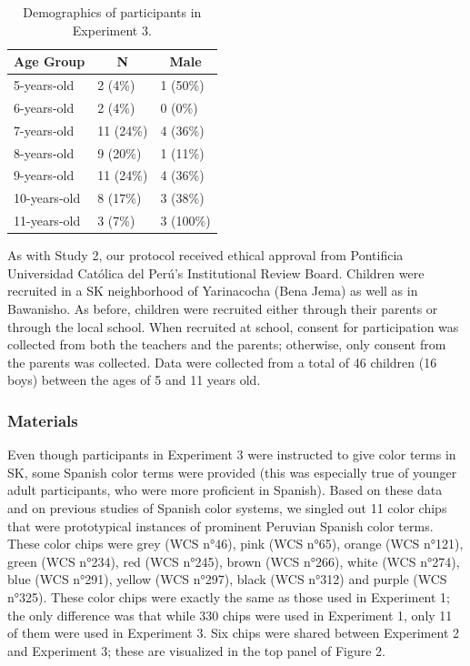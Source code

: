 \documentclass[floatsintext,man]{apa6}
\theoremstyle{definition}
\theoremstyle{definition}
\theoremstyle{definition}
\theoremstyle{remark}
\begin{document}
\begin{table}[tbp]
\begin{center}
\begin{threeparttable}
\caption{\label{tab:unnamed-chunk-3}Demographics of participants in Experiment 3.}
\begin{tabular}{lll}
\toprule
Age Group & \multicolumn{1}{c}{N} & \multicolumn{1}{c}{Male}\\
\midrule
5-years-old & 2 (4\%) & 1 (50\%)\\
6-years-old & 2 (4\%) & 0 (0\%)\\
7-years-old & 11 (24\%) & 4 (36\%)\\
8-years-old & 9 (20\%) & 1 (11\%)\\
9-years-old & 11 (24\%) & 4 (36\%)\\
10-years-old & 8 (17\%) & 3 (38\%)\\
11-years-old & 3 (7\%) & 3 (100\%)\\
\bottomrule
\end{tabular}
\end{threeparttable}
\end{center}
\end{table}

As with Study 2, our protocol received ethical approval from Pontificia
Universidad Católica del Perú's Institutional Review Board. Children
were recruited in a SK neighborhood of Yarinacocha (Bena Jema) as well
as in Bawanisho. As before, children were recruited either through their
parents or through the local school. When recruited at school, consent
for participation was collected from both the teachers and the parents;
otherwise, only consent from the parents was collected. Data were
collected from a total of 46 children (16 boys) between the ages of 5
and 11 years old.

\subsubsection{Materials}\label{materials-2}

Even though participants in Experiment 3 were instructed to give color
terms in SK, some Spanish color terms were provided (this was especially
true of younger adult participants, who were more proficient in
Spanish). Based on these data and on previous studies of Spanish color
systems, we singled out 11 color chips that were prototypical instances
of prominent Peruvian Spanish color terms. These color chips were grey
(WCS n°46), pink (WCS n°65), orange (WCS n°121), green (WCS n°234), red
(WCS n°245), brown (WCS n°266), white (WCS n°274), blue (WCS n°291),
yellow (WCS n°297), black (WCS n°312) and purple (WCS n°325). These
color chips were exactly the same as those used in Experiment 1; the
only difference was that while 330 chips were used in Experiment 1, only
11 of them were used in Experiment 3. Six chips were shared between
Experiment 2 and Experiment 3; these are visualized in the top panel of
Figure 2.
\end{document}
